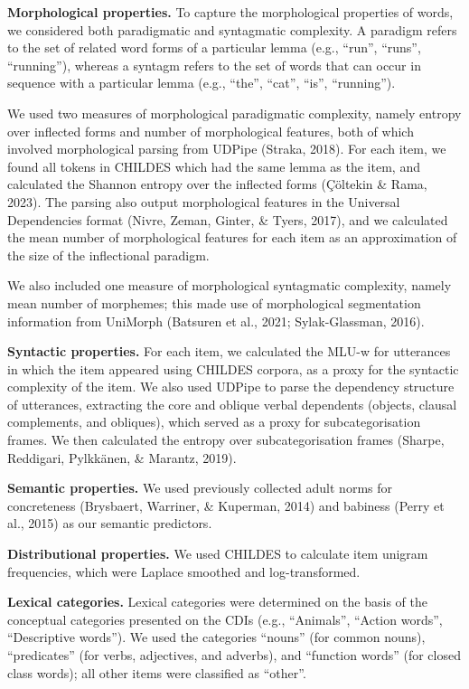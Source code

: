 \documentclass[10pt, letterpaper]{article}
\begin{document}
\textbf{Morphological properties.} To capture the morphological
properties of words, we considered both paradigmatic and syntagmatic
complexity. A paradigm refers to the set of related word forms of a
particular lemma (e.g., ``run'', ``runs'', ``running''), whereas a
syntagm refers to the set of words that can occur in sequence with a
particular lemma (e.g., ``the'', ``cat'', ``is'', ``running'').

We used two measures of morphological paradigmatic complexity, namely
entropy over inflected forms and number of morphological features, both
of which involved morphological parsing from UDPipe (Straka, 2018). For
each item, we found all tokens in CHILDES which had the same lemma as
the item, and calculated the Shannon entropy over the inflected forms
(Çöltekin \& Rama, 2023). The parsing also output morphological features
in the Universal Dependencies format (Nivre, Zeman, Ginter, \& Tyers,
2017), and we calculated the mean number of morphological features for
each item as an approximation of the size of the inflectional paradigm.

We also included one measure of morphological syntagmatic complexity,
namely mean number of morphemes; this made use of morphological
segmentation information from UniMorph (Batsuren et al., 2021;
Sylak-Glassman, 2016).

\textbf{Syntactic properties.} For each item, we calculated the MLU-w
for utterances in which the item appeared using CHILDES corpora, as a
proxy for the syntactic complexity of the item. We also used UDPipe to
parse the dependency structure of utterances, extracting the core and
oblique verbal dependents (objects, clausal complements, and obliques),
which served as a proxy for subcategorisation frames. We then calculated
the entropy over subcategorisation frames (Sharpe, Reddigari, Pylkkänen,
\& Marantz, 2019).

\textbf{Semantic properties.} We used previously collected adult norms
for concreteness (Brysbaert, Warriner, \& Kuperman, 2014) and babiness
(Perry et al., 2015) as our semantic predictors.

\textbf{Distributional properties.} We used CHILDES to calculate item
unigram frequencies, which were Laplace smoothed and log-transformed.

\textbf{Lexical categories.} Lexical categories were determined on the
basis of the conceptual categories presented on the CDIs (e.g.,
``Animals'', ``Action words'', ``Descriptive words''). We used the
categories ``nouns'' (for common nouns), ``predicates'' (for verbs,
adjectives, and adverbs), and ``function words'' (for closed class
words); all other items were classified as ``other''.
\end{document}
